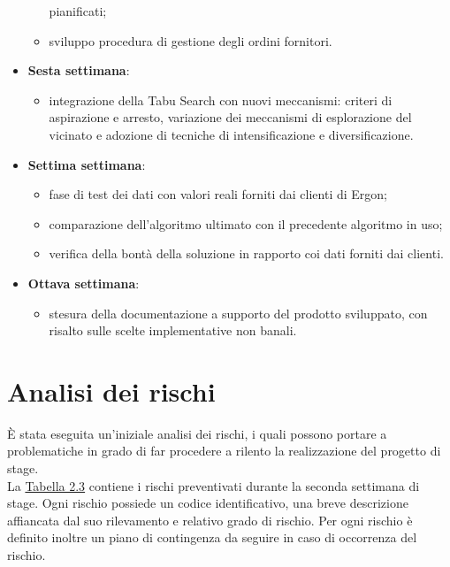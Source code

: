 \begin{itemize}
\begin{itemize}
		pianificati;
			\item sviluppo procedura di gestione degli ordini fornitori.
		\end{itemize}
	\item \textbf{Sesta settimana}:
		\begin{itemize}
		\item integrazione della Tabu Search con nuovi meccanismi:
		criteri di aspirazione e arresto, variazione dei
		meccanismi di esplorazione del vicinato e adozione di
		tecniche di intensificazione e diversificazione.
		\end{itemize}
	\item \textbf{Settima settimana}:
		\begin{itemize}
		\item fase di test dei dati con valori reali forniti dai clienti di Ergon;
		\item comparazione dell'algoritmo ultimato con il precedente algoritmo in uso;
		\item verifica della bontà della soluzione in rapporto coi dati forniti dai clienti.
		\end{itemize}
	\item \textbf{Ottava settimana}:
		\begin{itemize}
		\item stesura della documentazione a supporto del prodotto sviluppato, con risalto sulle scelte implementative non banali.
		\end{itemize}
\end{itemize}

\pagebreak
\section{Analisi dei rischi}
È stata eseguita un'iniziale analisi dei rischi, i quali possono portare a problematiche in grado di far procedere a rilento la realizzazione del progetto di stage.\\
La \hyperref[rischi]{Tabella 2.3} contiene i rischi preventivati durante la seconda settimana di stage. Ogni rischio possiede un codice identificativo,
una breve descrizione affiancata dal suo rilevamento e relativo grado di rischio. Per ogni rischio è definito inoltre un piano di contingenza da seguire 
in caso di occorrenza del rischio.\\


